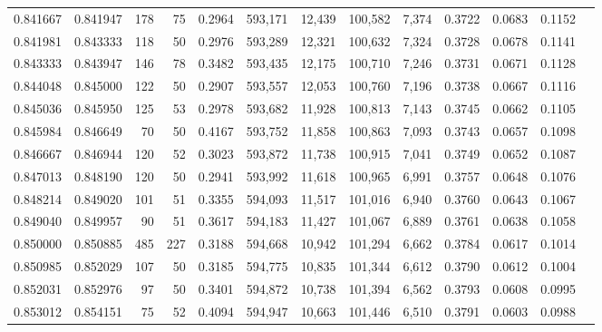 \begin{tabular}{rrrrrrrrrrrrr}
0.841667 & 0.841947 &    178 &    75 &                                     0.2964 & 593,171 &  12,439 & 100,582 &   7,374 & 0.3722 & 0.0683 & 0.1152 \\
0.841981 & 0.843333 &    118 &    50 &                                     0.2976 & 593,289 &  12,321 & 100,632 &   7,324 & 0.3728 & 0.0678 & 0.1141 \\
0.843333 & 0.843947 &    146 &    78 &                                     0.3482 & 593,435 &  12,175 & 100,710 &   7,246 & 0.3731 & 0.0671 & 0.1128 \\
0.844048 & 0.845000 &    122 &    50 &                                     0.2907 & 593,557 &  12,053 & 100,760 &   7,196 & 0.3738 & 0.0667 & 0.1116 \\
0.845036 & 0.845950 &    125 &    53 &                                     0.2978 & 593,682 &  11,928 & 100,813 &   7,143 & 0.3745 & 0.0662 & 0.1105 \\
0.845984 & 0.846649 &     70 &    50 &                                     0.4167 & 593,752 &  11,858 & 100,863 &   7,093 & 0.3743 & 0.0657 & 0.1098 \\
0.846667 & 0.846944 &    120 &    52 &                                     0.3023 & 593,872 &  11,738 & 100,915 &   7,041 & 0.3749 & 0.0652 & 0.1087 \\
0.847013 & 0.848190 &    120 &    50 &                                     0.2941 & 593,992 &  11,618 & 100,965 &   6,991 & 0.3757 & 0.0648 & 0.1076 \\
0.848214 & 0.849020 &    101 &    51 &                                     0.3355 & 594,093 &  11,517 & 101,016 &   6,940 & 0.3760 & 0.0643 & 0.1067 \\
0.849040 & 0.849957 &     90 &    51 &                                     0.3617 & 594,183 &  11,427 & 101,067 &   6,889 & 0.3761 & 0.0638 & 0.1058 \\
0.850000 & 0.850885 &    485 &   227 &                                     0.3188 & 594,668 &  10,942 & 101,294 &   6,662 & 0.3784 & 0.0617 & 0.1014 \\
0.850985 & 0.852029 &    107 &    50 &                                     0.3185 & 594,775 &  10,835 & 101,344 &   6,612 & 0.3790 & 0.0612 & 0.1004 \\
0.852031 & 0.852976 &     97 &    50 &                                     0.3401 & 594,872 &  10,738 & 101,394 &   6,562 & 0.3793 & 0.0608 & 0.0995 \\
0.853012 & 0.854151 &     75 &    52 &                                     0.4094 & 594,947 &  10,663 & 101,446 &   6,510 & 0.3791 & 0.0603 & 0.0988 \\

\end{tabular}
